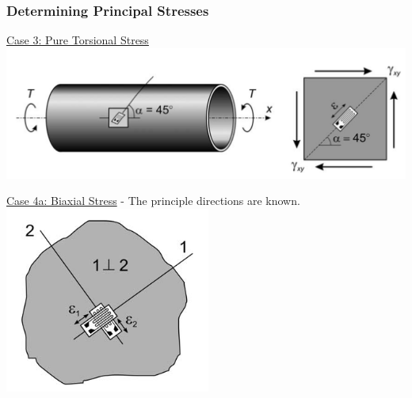 \documentclass[fleqn]{beamer} %
\newcommand{\sectionIIIsubsectionIIItitle}{Determining Principal Stresses}
\begin{document}
			\begin{frame}[containsverbatim]
				\frametitle{\sectionIIIsubsectionIIItitle}\scriptsize

				\underline{Case 3: Pure Torsional Stress} 
				\includegraphics[scale=.18]{images/metu_fig3.png}

				\vspc

				\underline{Case 4a: Biaxial Stress} - The principle directions are known.\vspc
				\includegraphics[scale=.20]{images/metu_fig4.png}

				\vspc
				
			\end{frame}
\end{document}
